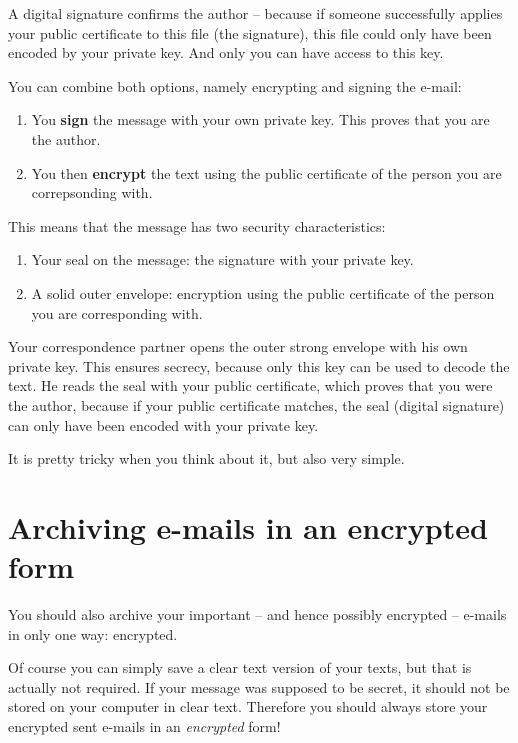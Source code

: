 \documentclass[a4paper,11pt,oneside,openright,titlepage]{scrbook}
\newcommand{\Email}{e-mail}
\begin{document}
A digital signature confirms the author  -- because if someone
successfully applies your public certificate to this file (the
signature), this file could only have been encoded by your private
key. And only you can have access to this key.

You can combine both options, namely encrypting and signing the
\Email{}:

\begin{enumerate}
    \item You \textbf{sign} the message with your own private key.
        This proves that you are the author.
    \item You then \textbf{encrypt} the text using the public
        certificate of the person you are correpsonding with.
\end{enumerate}

This means that the message has two security characteristics:

\begin{enumerate}
    \item Your seal on the message: the signature with your private
        key.
    \item A solid outer envelope: encryption using the public
        certificate of the person you are corresponding with.
\end{enumerate}


Your correspondence partner opens the outer strong envelope with his
own private key. This ensures secrecy, because only this key can be
used to decode the text. He reads the seal with your public
certificate, which proves that you were the author, because if your
public certificate matches, the seal (digital signature) can only have
been encoded with your private key.

It is pretty tricky when you think about it, but also very simple.


\clearpage
\chapter{Archiving \Email{}s in an encrypted form}
\label{ch:archive}

You should also archive your important -- and hence possibly encrypted
-- \Email{}s in only one way: encrypted.

Of course you can simply save a clear text version of your texts, but
that is actually not required. If your message was supposed to be
secret, it should not be stored on your computer in clear text.
Therefore you should always store your encrypted sent \Email{}s in an
\textit{encrypted} form!
\end{document}
